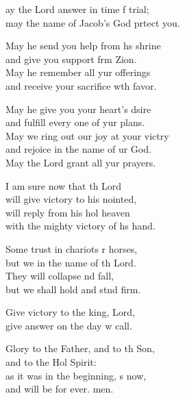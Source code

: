 \settowidth{\versewidth}{May we ring out our joy at your victory +}
\begin{psalmverse}%
  \begin{patverse}
ay the Lord answer in time f trial;\Med\\
may the name of Jacob’s God prtect you.

May he send you help from h\pointup{\i}s shrine\Med\\
and give you support frm Zion.\\
May he remember all yur offerings\Med\\
and receive your sacrifice w\pointup{\i}th favor.

May he give you your heart’s dsire\Med\\
and fulfill every one of yur plans.\\
May we ring out our joy at your victry\Flex\\
and rejoice in the name of ur God.\Med\\
May the Lord grant all yur prayers.

I am sure now that th Lord\Med\\
will give victory to his nointed,\\
will reply from his hol heaven\Med\\
with the mighty victory of h\pointup{\i}s hand.

Some trust in chariots r horses,\Med\\
but we in the name of th Lord.\\
They will collapse nd fall,\Med\\
but we shall hold and stnd firm.

Give victory to the king,  Lord,\Med\\
give answer on the day w call.

Glory to the Father, and to th Son,\Med\\
and to the Hol Spirit:\\
as it was in the beginning, \pointup{\i}s now,\Med\\
and will be for ever. men.
  \end{patverse}
\end{psalmverse}

